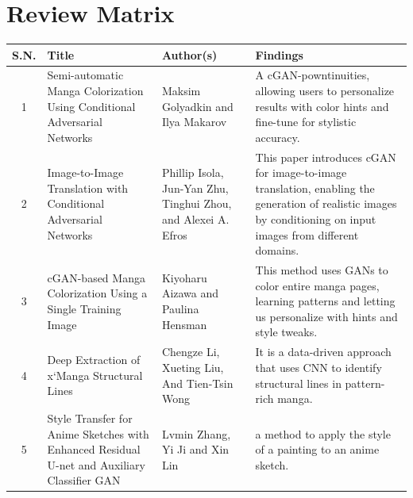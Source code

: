 \newpage
\section{Review Matrix}
\begin{table}[htp]
  \begin{tabular}{|c|p{4cm}|p{3cm}|p{4.5cm}|}
    \hline
    \textbf{S.N.} & \textbf{Title} & \textbf{Author(s)} & \textbf{Findings} \\ \hline
    
    1 & 
    Semi-automatic Manga Colorization Using Conditional Adversarial Networks \cite{10.1007/978-3-030-72610-2_17}  & 
    Maksim Golyadkin and Ilya Makarov &
    
    A cGAN-powntinuities, allowing users to personalize results with color hints and fine-tune for stylistic accuracy. \\ \hline

    2 & 
    Image-to-Image Translation with Conditional Adversarial Networks \cite{isola2018imagetoimage} & 
    Phillip Isola, Jun-Yan Zhu, Tinghui Zhou, and Alexei A. Efros & 
    This paper introduces cGAN for image-to-image translation, enabling the generation of realistic images by conditioning on input images from different domains. \\ \hline

    3 & 
    cGAN-based Manga Colorization Using a Single Training Image \cite{hensman2017cganbased} & 
    Kiyoharu Aizawa and Paulina Hensman &
    This method uses GANs to color entire manga pages, learning patterns and letting us personalize with hints and style tweaks. \\ \hline

    4 & Deep Extraction of x`Manga Structural Lines \cite{li-2017-deep} & Chengze Li, Xueting Liu, And Tien-Tsin Wong
    & It is a data-driven approach that uses CNN to identify structural lines in pattern-rich manga. \\ \hline

     5 & Style Transfer for Anime Sketches
    with Enhanced Residual U-net and Auxiliary Classifier GAN \cite{ACPR2017ZLM} &
    Lvmin Zhang, Yi Ji and Xin Lin & a method to apply the style of a painting to an anime sketch. \\ \hline

         \end{tabular}
\end{table}

\newpage

